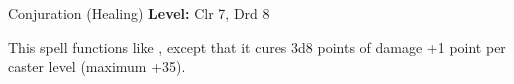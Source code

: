 {Conjuration (Healing)}
{
	\textbf{Level:}
	Clr 7, Drd 8\\
}
{
	This spell functions like , except that it cures 3d8 points of damage +1 point per caster level (maximum +35).

}
